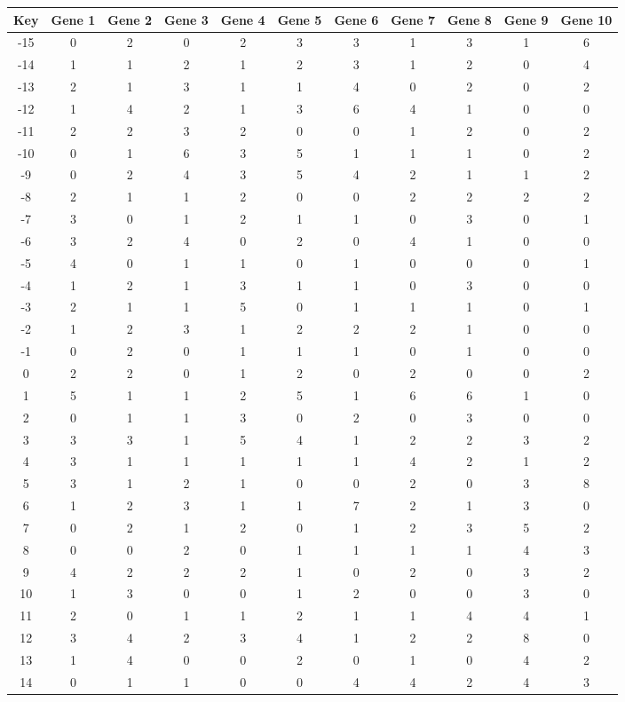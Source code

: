 \begin{tabular}{|c|c|c|c|c|c|c|c|c|c|c|}
\hline
Key & Gene 1 & Gene 2 & Gene 3 & Gene 4 & Gene 5 & Gene 6 & Gene 7 & Gene 8 & Gene 9 & Gene 10 \\
\hline
-15 & 0 & 2 & 0 & 2 & 3 & 3 & 1 & 3 & 1 & 6 \\
-14 & 1 & 1 & 2 & 1 & 2 & 3 & 1 & 2 & 0 & 4 \\
-13 & 2 & 1 & 3 & 1 & 1 & 4 & 0 & 2 & 0 & 2 \\
-12 & 1 & 4 & 2 & 1 & 3 & 6 & 4 & 1 & 0 & 0 \\
-11 & 2 & 2 & 3 & 2 & 0 & 0 & 1 & 2 & 0 & 2 \\
-10 & 0 & 1 & 6 & 3 & 5 & 1 & 1 & 1 & 0 & 2 \\
-9 & 0 & 2 & 4 & 3 & 5 & 4 & 2 & 1 & 1 & 2 \\
-8 & 2 & 1 & 1 & 2 & 0 & 0 & 2 & 2 & 2 & 2 \\
-7 & 3 & 0 & 1 & 2 & 1 & 1 & 0 & 3 & 0 & 1 \\
-6 & 3 & 2 & 4 & 0 & 2 & 0 & 4 & 1 & 0 & 0 \\
-5 & 4 & 0 & 1 & 1 & 0 & 1 & 0 & 0 & 0 & 1 \\
-4 & 1 & 2 & 1 & 3 & 1 & 1 & 0 & 3 & 0 & 0 \\
-3 & 2 & 1 & 1 & 5 & 0 & 1 & 1 & 1 & 0 & 1 \\
-2 & 1 & 2 & 3 & 1 & 2 & 2 & 2 & 1 & 0 & 0 \\
-1 & 0 & 2 & 0 & 1 & 1 & 1 & 0 & 1 & 0 & 0 \\
0 & 2 & 2 & 0 & 1 & 2 & 0 & 2 & 0 & 0 & 2 \\
1 & 5 & 1 & 1 & 2 & 5 & 1 & 6 & 6 & 1 & 0 \\
2 & 0 & 1 & 1 & 3 & 0 & 2 & 0 & 3 & 0 & 0 \\
3 & 3 & 3 & 1 & 5 & 4 & 1 & 2 & 2 & 3 & 2 \\
4 & 3 & 1 & 1 & 1 & 1 & 1 & 4 & 2 & 1 & 2 \\
5 & 3 & 1 & 2 & 1 & 0 & 0 & 2 & 0 & 3 & 8 \\
6 & 1 & 2 & 3 & 1 & 1 & 7 & 2 & 1 & 3 & 0 \\
7 & 0 & 2 & 1 & 2 & 0 & 1 & 2 & 3 & 5 & 2 \\
8 & 0 & 0 & 2 & 0 & 1 & 1 & 1 & 1 & 4 & 3 \\
9 & 4 & 2 & 2 & 2 & 1 & 0 & 2 & 0 & 3 & 2 \\
10 & 1 & 3 & 0 & 0 & 1 & 2 & 0 & 0 & 3 & 0 \\
11 & 2 & 0 & 1 & 1 & 2 & 1 & 1 & 4 & 4 & 1 \\
12 & 3 & 4 & 2 & 3 & 4 & 1 & 2 & 2 & 8 & 0 \\
13 & 1 & 4 & 0 & 0 & 2 & 0 & 1 & 0 & 4 & 2 \\
14 & 0 & 1 & 1 & 0 & 0 & 4 & 4 & 2 & 4 & 3 \\
\hline
\end{tabular}